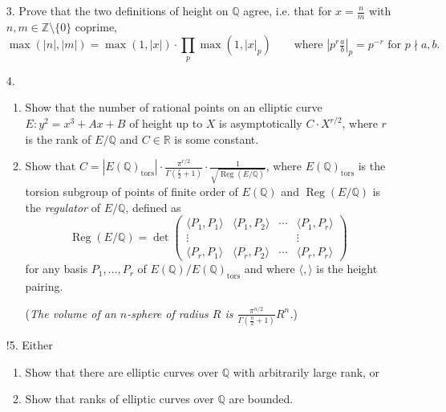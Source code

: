 \documentclass[a4paper]{article}
\theoremstyle{definition}
\DeclareMathOperator{\Reg}{Reg}
\newcommand{\tors}{\mathrm{tors}}
\newcommand{\Z}{\mathbb{Z}}
\newcommand{\Q}{\mathbb{Q}}
\newcommand{\R}{\mathbb{R}}
\begin{document}
\begin{enumerate}
    \item[3.] Prove that the two definitions of height on $\Q$ agree, i.e. that
        for $x=\frac{n}{m}$ with $n,m\in\Z\setminus\{0\}$ coprime,
        \begin{equation*}
            \max(|n|,|m|) = \max(1,|x|)\cdot\prod_p\max(1,|x|_p)
            \qquad \text{where $|p^r\tfrac{a}{b}|_p=p^{-r}$ for $p\nmid a,b$.}
        \end{equation*}

    \item[4.]
        \begin{enumerate}[label=(\roman*)]
            \item Show that the number of rational points on an elliptic curve
                $E:y^2=x^3+Ax+B$ of height up to $X$ is asymptotically
                $C\cdot X^{r/2}$, where $r$ is the rank of $E/\Q$ and $C\in\R$
                is some constant.

            \item Show that
                $C=|E(\Q)_\tors|\cdot\frac{\pi^{r/2}}{\Gamma(\frac{r}{2}+1)}
                \cdot\frac{1}{\sqrt{\Reg(E/\Q)}}$, where $E(\Q)_\tors$ is the
                torsion subgroup of points of finite order of $E(\Q)$ and
                $\Reg(E/\Q)$ is the \emph{regulator} of $E/\Q$, defined as
                \begin{equation*}
                    \Reg(E/\Q) = \det\begin{pmatrix}
                        \langle P_1,P_1\rangle & \langle P_1,P_2\rangle
                            & \cdots & \langle P_1,P_r\rangle \\
                        \vdots & & & \vdots \\
                        \langle P_r,P_1\rangle & \langle P_r,P_2\rangle
                            & \cdots & \langle P_r,P_r\rangle
                    \end{pmatrix}
                \end{equation*}
                for any basis $P_1,\ldots,P_r$ of $E(\Q)/E(\Q)_\tors$ and where
                $\langle,\rangle$ is the height pairing.

                (\textit{The volume of an $n$-sphere of radius $R$ is
                $\frac{\pi^{n/2}}{\Gamma(\frac{n}{2}+1)}R^n$.})
        \end{enumerate}

    \item[!5.] Either
        \begin{enumerate}[label=(\roman*)]
            \item Show that there are elliptic curves over $\Q$ with arbitrarily
                large rank, or
            \item Show that ranks of elliptic curves over $\Q$ are bounded.
        \end{enumerate}
\end{enumerate}
\end{document}
